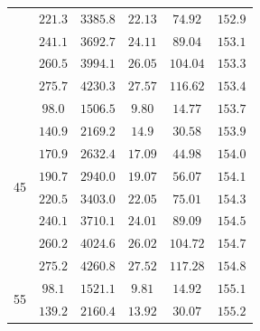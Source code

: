 \documentclass[a4paper,12pt]{article}
\begin{document}
\begin{table}[H]
\begin{center}
\begin{tabular}{|c|c|c|c|c|c|}
                    & $221.3$                 & $3385.8$                  & $22.13$        & $74.92$         & $152.9$                   \\\cline{2-6}
                    & $241.1$                 & $3692.7$                  & $24.11$        & $89.04$         & $153.1$                   \\\cline{2-6}
                    & $260.5$                 & $3994.1$                  & $26.05$        & $104.04$        & $153.3$                   \\\cline{2-6}
                    & $275.7$                 & $4230.3$                  & $27.57$        & $116.62$        & $153.4$                   \\\hline
      \multirow{8}{*}{45}
                    & $98.0$                  & $1506.5$                  & $9.80$         & $14.77$         & $153.7$                   \\\cline{2-6}
                    & $140.9$                 & $2169.2$                  & $14.9$         & $30.58$         & $153.9$                   \\\cline{2-6}
                    & $170.9$                 & $2632.4$                  & $17.09$        & $44.98$         & $154.0$                   \\\cline{2-6}
                    & $190.7$                 & $2940.0$                  & $19.07$        & $56.07$         & $154.1$                   \\\cline{2-6}
                    & $220.5$                 & $3403.0$                  & $22.05$        & $75.01$         & $154.3$                   \\\cline{2-6}
                    & $240.1$                 & $3710.1$                  & $24.01$        & $89.09$         & $154.5$                   \\\cline{2-6}
                    & $260.2$                 & $4024.6$                  & $26.02$        & $104.72$        & $154.7$                   \\\cline{2-6}
                    & $275.2$                 & $4260.8$                  & $27.52$        & $117.28$        & $154.8$                   \\\hline
      \multirow{8}{*}{55}
                    & $98.1$                  & $1521.1$                  & $9.81$         & $14.92$         & $155.1$                   \\\cline{2-6}
                    & $139.2$                 & $2160.4$                  & $13.92$        & $30.07$         & $155.2$                   \\\cline{2-6}

\end{tabular}
\end{center}
\end{table}
\end{document}
